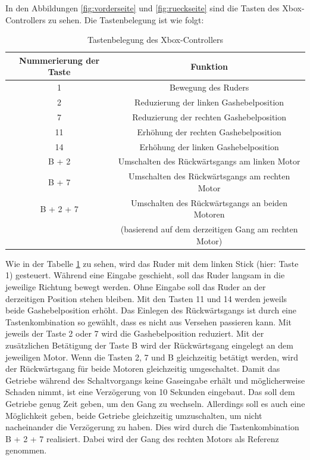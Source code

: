 In den Abbildungen \ref{fig:vorderseite} und \ref{fig:rueckseite} sind die Tasten des Xbox-Controllers zu sehen.
Die Tastenbelegung ist wie folgt:
\begin{table}[H]
    \begin{tabular}{|c|c|}
    \hline
    \rowcolor[gray]{0.8}
     Nummerierung der Taste & Funktion \\ \hline 
     1 & Bewegung des Ruders \\ \hline 
     2 & Reduzierung der linken Gashebelposition \\ \hline 
     7 & Reduzierung der rechten Gashebelposition \\ \hline
     11 & Erhöhung der rechten Gashebelposition \\ \hline
     14 & Erhöhung der linken Gashebelposition \\ \hline
     B + 2 & Umschalten des Rückwärtsgangs am linken Motor \\ \hline
     B + 7 & Umschalten des Rückwärtsgangs am rechten Motor \\ \hline
     B + 2 + 7 & Umschalten des Rückwärtsgangs an beiden Motoren \\
      & (basierend auf dem derzeitigen Gang am rechten Motor) \\ \hline
    \end{tabular}
    \caption{Tastenbelegung des Xbox-Controllers}
    \label{fig:tableTastenbelegung}
\end{table}
Wie in der Tabelle \ref{fig:tableTastenbelegung} zu sehen, wird das Ruder mit dem linken Stick (hier: Taste 1) gesteuert.
Während eine Eingabe geschieht, soll das Ruder langsam in die jeweilige Richtung bewegt werden. Ohne Eingabe soll das
Ruder an der derzeitigen Position stehen bleiben.
Mit den Tasten 11 und 14 werden jeweils beide Gashebelposition erhöht. 
Das Einlegen des Rückwärtsgangs ist durch eine Tastenkombination so gewählt, dass es nicht aus Versehen passieren kann.
Mit jeweils der Taste 2 oder 7 wird die Gashebelposition reduziert. Mit der zusätzlichen Betätigung der Taste B wird der 
Rückwärtsgang eingelegt an dem jeweiligen Motor. Wenn die Tasten 2, 7 und B gleichzeitig betätigt werden, 
wird der Rückwärtsgang für beide Motoren gleichzeitig umgeschaltet.
Damit das Getriebe während des Schaltvorgangs keine Gaseingabe erhält und möglicherweise Schaden nimmt, 
ist eine Verzögerung von 10 Sekunden eingebaut. 
Das soll dem Getriebe genug Zeit geben, um den Gang zu wechseln.
Allerdings soll es auch eine Möglichkeit geben, beide Getriebe gleichzeitig umzuschalten, um nicht 
nacheinander die Verzögerung zu haben. Dies wird durch die Tastenkombination B + 2 + 7 realisiert.
Dabei wird der Gang des rechten Motors als Referenz genommen. \\


